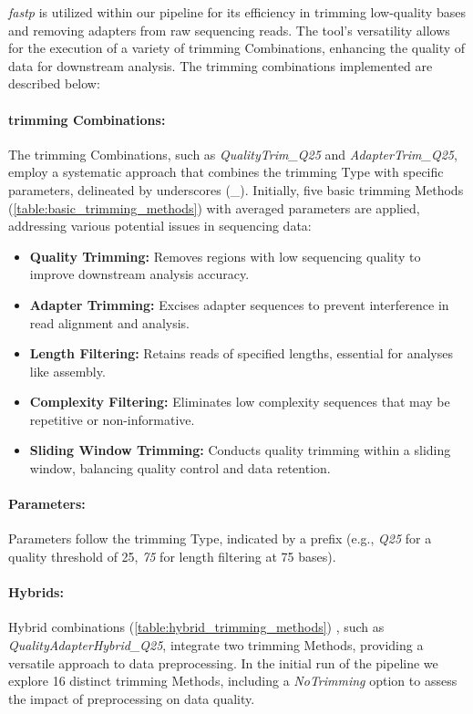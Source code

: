 \textit{fastp} is utilized within our pipeline for its efficiency in \gls{trimming} low-quality bases and removing adapters from raw sequencing reads. The tool's versatility allows for the execution of a variety of \gls{trimming} Combinations, enhancing the quality of data for downstream analysis. The \gls{trimming} combinations implemented are described below:

\paragraph{\gls{trimming} Combinations:}
The \gls{trimming} Combinations, such as \textit{QualityTrim\_Q25} and \textit{AdapterTrim\_Q25}, employ a systematic approach that combines the \gls{trimming} Type with specific parameters, delineated by underscores (\_). Initially, five basic \gls{trimming} Methods (\autoref{table:basic_trimming_methods}) with averaged parameters are applied, addressing various potential issues in sequencing data:

\begin{itemize}
    \item \textbf{Quality Trimming:} Removes regions with low sequencing quality to improve downstream analysis accuracy.
    \item \textbf{Adapter Trimming:} Excises adapter sequences to prevent interference in read alignment and analysis.
    \item \textbf{Length Filtering:} Retains reads of specified lengths, essential for analyses like assembly.
    \item \textbf{Complexity Filtering:} Eliminates low complexity sequences that may be repetitive or non-informative.
    \item \textbf{Sliding Window Trimming:} Conducts quality trimming within a sliding window, balancing quality control and data retention.
\end{itemize}

\paragraph{Parameters:}
Parameters follow the \gls{trimming} Type, indicated by a prefix (e.g., \textit{Q25} for a quality threshold of 25, \textit{75} for length filtering at 75 bases). 

\paragraph{Hybrids:}
Hybrid combinations (\autoref{table:hybrid_trimming_methods}) , such as \textit{QualityAdapterHybrid\_Q25}, integrate two \gls{trimming} Methods, providing a versatile approach to data preprocessing. In the initial run of the pipeline we explore 16 distinct \gls{trimming} Methods, including a \textit{NoTrimming} option to assess the impact of preprocessing on data quality.

